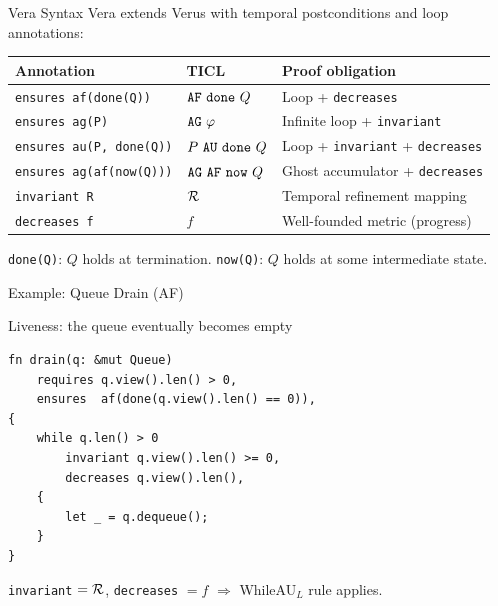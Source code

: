 \documentclass[aspectratio=169]{beamer}
\begin{document}
\begin{frame}[fragile]{Vera Syntax}
  Vera extends Verus with temporal postconditions and loop annotations:

  \vspace{0.2cm}
  \begin{tabular}{l l l}
    \textbf{Annotation} & \textbf{TICL} & \textbf{Proof obligation} \\
    \hline
    \verb|ensures af(done(Q))| & $\AF{\done{Q}}$ & Loop + \verb|decreases| \\
    \verb|ensures ag(P)| & $\AG{\varphi}$ & Infinite loop + \verb|invariant| \\
    \verb|ensures au(P, done(Q))| & $\AU{P}{\done{Q}}$ & Loop + \verb|invariant| + \verb|decreases| \\
    \verb|ensures ag(af(now(Q)))| & $\AG{\AF{\now{Q}}}$ & Ghost accumulator + \verb|decreases| \\
    \hline
    \verb|invariant R| & $\mathcal{R}$ & Temporal refinement mapping \\
    \verb|decreases f| & $f$ & Well-founded metric (progress) \\
  \end{tabular}

  \vspace{0.3cm}
  \verb|done(Q)|: $Q$ holds at termination. \quad
  \verb|now(Q)|: $Q$ holds at some intermediate state.
\end{frame}

\begin{frame}[fragile]{Example: Queue Drain (AF)}
  \begin{block}{Liveness: the queue eventually becomes empty}
  \end{block}
  \vspace{-0.2cm}
  \begin{lstlisting}
fn drain(q: &mut Queue)
    requires q.view().len() > 0,
    ensures  af(done(q.view().len() == 0)),
{
    while q.len() > 0
        invariant q.view().len() >= 0,
        decreases q.view().len(),
    {
        let _ = q.dequeue();
    }
}
  \end{lstlisting}
  \vspace{-0.2cm}
  \verb|invariant| $= \mathcal{R}$, \quad
  \verb|decreases| $= f$ \quad $\Rightarrow$ \quad WhileAU$_L$ rule applies.
\end{frame}
\end{document}
